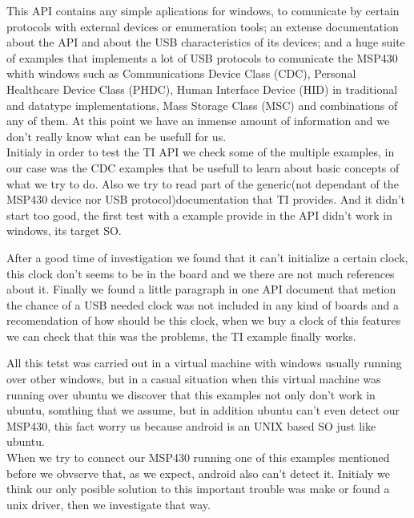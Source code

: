 		This API contains any simple aplications for windows, to comunicate by certain protocols with external devices or enumeration tools; an extense documentation about the API and about the USB characteristics of its devices; and a huge suite of examples that implements a lot of USB protocols to comunicate the MSP430 whith windows such as Communications Device Class (CDC), Personal Healthcare Device Class (PHDC), Human Interface Device (HID) in traditional and datatype implementations, Mass Storage Class (MSC) and combinations of any of them. At this point we have an inmense amount of information and we don't really know what can be usefull for us.\\
		
		Initialy in order to test the TI API we check some of the multiple examples, in our case was the CDC examples that be usefull to learn about basic concepts of what we try to do. Also we try to read part of the generic(not dependant of the MSP430 device nor USB protocol)documentation that TI provides. And it didn't start too good, the first test with a example provide in the API didn't work in windows, its target SO.

		After a good time of investigation we found that it can't initialize a certain clock, this clock don't seems to be in the board and we there are not much references about it. Finally we found a little paragraph in one API document that metion the chance of a USB needed clock was not included in any kind of boards and a recomendation of how should be this clock, when we buy a clock of this features we can check that this was the problems, the TI example finally works.

		All this tetst was carried out in a virtual machine with windows usually running over other windows, but in a casual situation when this virtual machine was running over ubuntu we discover that this examples not only don't work in ubuntu, somthing that we assume, but in addition ubuntu can't even detect our MSP430, this fact worry us because android is an UNIX based SO just like ubuntu. \\

		When we try to connect our MSP430 running one of this examples mentioned before we obvserve that, as we expect, android also can't detect it. Initialy we think our only posible solution to this important trouble was make or found a unix driver, then we investigate that way. \\

